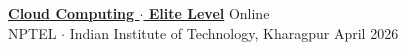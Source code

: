 \item{
    \href{https://drive.google.com/file/d/1wQZUhOMMbQcNX8vtpGdKNaJhsAZF1Z2b/view}{\textbf{Cloud Computing $\cdot$ Elite Level}} \hfill {Online} \\
    {NPTEL $\cdot$ Indian Institute of Technology, Kharagpur} \hfill {April 2026} \\
}
